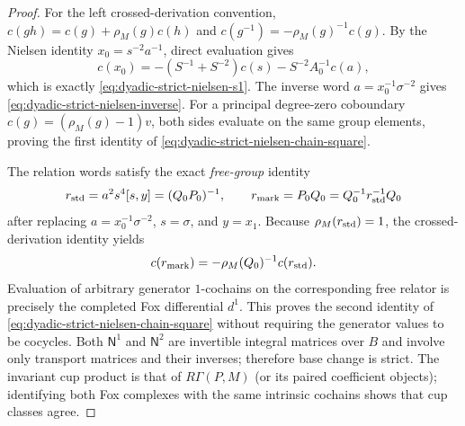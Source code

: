 \documentclass[11pt]{article}
\theoremstyle{definition}
\begin{document}
\begin{proof}
For the left crossed-derivation convention,
$c(gh)=c(g)+\rho_M(g)c(h)$ and
$c(g^{-1})=-\rho_M(g)^{-1}c(g)$.
By the Nielsen identity
$x_0=s^{-2}a^{-1}$, direct evaluation gives
\[
c(x_0)=
 -(S^{-1}+S^{-2})c(s)
 -S^{-2}A_0^{-1}c(a),
\]
which is exactly
\eqref{eq:dyadic-strict-nielsen-s1}.
The inverse word
$a=x_0^{-1}\sigma^{-2}$
gives \eqref{eq:dyadic-strict-nielsen-inverse}.
For a principal degree-zero coboundary
$c(g)=(\rho_M(g)-1)v$,
both sides evaluate on the same group
elements, proving the first identity of
\eqref{eq:dyadic-strict-nielsen-chain-square}.

The relation words satisfy the exact
\emph{free-group} identity
\begin{equation}\label{eq:dyadic-nielsen-relator-conjugacy}
r_{\rm std}=a^2s^4[s,y]
          =(Q_0P_0)^{-1},\qquad
r_{\rm mark}=P_0Q_0
          =Q_0^{-1}r_{\rm std}^{-1}Q_0
\end{equation}
after replacing $a=x_0^{-1}\sigma^{-2}$,
$s=\sigma$, and $y=x_1$.
Because $\rho_M(r_{\rm std})=1$,
the crossed-derivation identity yields
\[
c(r_{\rm mark})
=-\rho_M(Q_0)^{-1}c(r_{\rm std}).
\]
Evaluation of arbitrary generator
$1$-cochains on the corresponding
free relator is precisely the completed
Fox differential $d^1$.
This proves the second identity of
\eqref{eq:dyadic-strict-nielsen-chain-square}
without requiring the generator values
to be cocycles.
Both $\mathsf N^1$ and $\mathsf N^2$
are invertible integral matrices
over $B$ and involve only transport
matrices and their inverses; therefore
base change is strict.
The invariant cup product is that of
$R\Gamma(P,M)$ (or its paired coefficient
objects); identifying both Fox complexes
with the same intrinsic cochains
shows that cup classes agree.
\end{proof}
\end{document}

